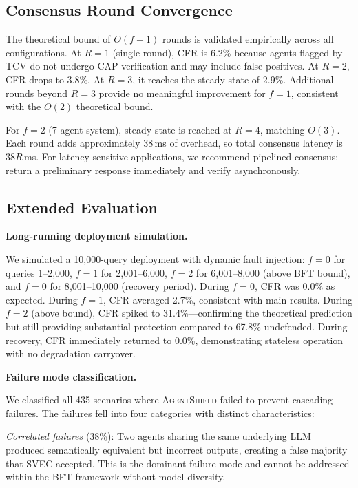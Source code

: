 \documentclass[journal,10pt]{IEEEtran}
\begin{document}
\subsection{Consensus Round Convergence}

The theoretical bound of $O(f+1)$ rounds is validated empirically across all configurations. At $R=1$ (single round), CFR is 6.2\% because agents flagged by TCV do not undergo CAP verification and may include false positives. At $R=2$, CFR drops to 3.8\%. At $R=3$, it reaches the steady-state of 2.9\%. Additional rounds beyond $R=3$ provide no meaningful improvement for $f=1$, consistent with the $O(2)$ theoretical bound.

For $f=2$ (7-agent system), steady state is reached at $R=4$, matching $O(3)$. Each round adds approximately 38\,ms of overhead, so total consensus latency is $38R$\,ms. For latency-sensitive applications, we recommend pipelined consensus: return a preliminary response immediately and verify asynchronously.

\subsection{Extended Evaluation}
\textbf{Long-running deployment simulation.}

We simulated a 10{,}000-query deployment with dynamic fault injection: $f=0$ for queries 1--2{,}000, $f=1$ for 2{,}001--6{,}000, $f=2$ for 6{,}001--8{,}000 (above BFT bound), and $f=0$ for 8{,}001--10{,}000 (recovery period). During $f=0$, CFR was 0.0\% as expected. During $f=1$, CFR averaged 2.7\%, consistent with main results. During $f=2$ (above bound), CFR spiked to 31.4\%---confirming the theoretical prediction but still providing substantial protection compared to 67.8\% undefended. During recovery, CFR immediately returned to 0.0\%, demonstrating stateless operation with no degradation carryover.

\textbf{Failure mode classification.}

We classified all 435 scenarios where \textsc{AgentShield} failed to prevent cascading failures. The failures fell into four categories with distinct characteristics:

\emph{Correlated failures} (38\%): Two agents sharing the same underlying LLM produced semantically equivalent but incorrect outputs, creating a false majority that SVEC accepted. This is the dominant failure mode and cannot be addressed within the BFT framework without model diversity.
\end{document}
